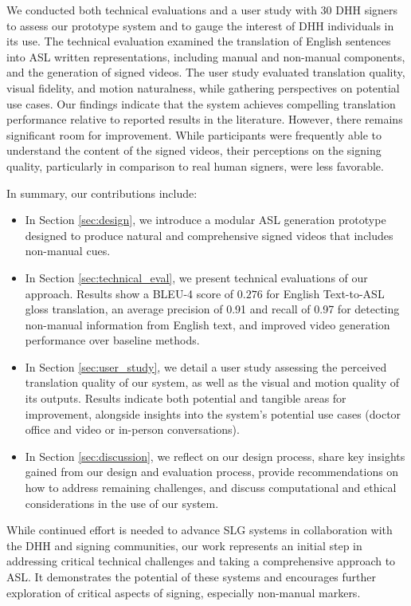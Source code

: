 We conducted both technical evaluations and a user study with 30 DHH signers to assess our prototype system and to gauge the interest of DHH individuals in its use. The technical evaluation examined the translation of English sentences into ASL written representations, including manual and non-manual components, and the generation of signed videos. The user study evaluated translation quality, visual fidelity, and motion naturalness, while gathering perspectives on potential use cases. 
Our findings indicate that the system achieves compelling translation performance relative to reported results in the literature. 
However, there remains significant room for improvement. While participants were frequently able to understand the content of the signed videos, their perceptions on the signing quality, particularly in comparison to real human signers, were less favorable.

In summary, our contributions include: 
\begin{itemize}
    \item In Section \ref{sec:design}, we introduce a modular ASL generation prototype designed to produce natural and comprehensive signed videos that includes non-manual cues.
    \item In Section \ref{sec:technical_eval}, we present technical evaluations of our approach. Results show a BLEU-4 score of $0.276$ for English Text-to-ASL gloss translation, an average precision of 0.91 and recall of 0.97 for detecting non-manual information from English text, and improved video generation performance over baseline methods.
    \item In Section \ref{sec:user_study}, we detail a user study assessing the perceived translation quality of our system, as well as the visual and motion quality of its outputs. Results indicate both potential and tangible areas for improvement, alongside insights into the system's potential use cases (\eg doctor office and video or in-person conversations).
    \item In Section \ref{sec:discussion}, we reflect on our design process, share key insights gained from our design and evaluation process, provide recommendations on how to address remaining challenges, and discuss computational and ethical considerations in the use of our system.
\end{itemize}

While continued effort is needed to advance SLG systems in collaboration with the DHH and signing communities, our work represents an initial step in addressing critical technical challenges and taking a comprehensive approach to ASL. It demonstrates the potential of these systems and encourages further exploration of critical aspects of signing, especially  non-manual markers. 
